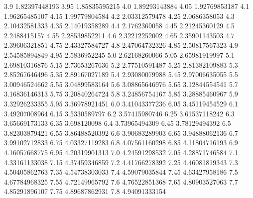             3.9    1.82397448193
           3.95    1.85835595215
            4.0    1.89293143884
           4.05    1.92769853187
            4.1    1.96265485107
           4.15    1.99779804584
            4.2    2.03312579478
           4.25     2.0686358053
            4.3    2.10432581333
           4.35    2.14019358289
            4.4     2.1762369058
           4.45    2.21245360129
            4.5     2.2488415157
           4.55    2.28539852211
            4.6    2.32212252002
           4.65    2.35901143503
            4.7    2.39606321851
           4.75    2.43327584727
            4.8    2.47064732326
           4.85    2.50817567323
            4.9    2.54585894849
           4.95     2.5836952245
            5.0    2.62168260066
           5.05    2.65981919997
            5.1    2.69810316876
           5.15    2.73653267636
            5.2    2.77510591487
           5.25    2.81382109883
            5.3    2.85267646496
           5.35    2.89167027189
            5.4    2.93080079988
           5.45    2.97006635055
            5.5    3.00946524662
           5.55    3.04899583164
            5.6    3.08865646976
           5.65    3.12844554541
            5.7    3.16836146313
           5.75    3.20840264724
            5.8    3.24856754167
           5.85    3.28885460967
            5.9    3.32926233355
           5.95    3.36978921451
            6.0    3.41043377236
           6.05    3.45119454529
            6.1    3.49207008964
           6.15     3.5330589797
            6.2    3.57415980746
           6.25    3.61537118242
            6.3    3.65669173133
           6.35      3.698120098
            6.4    3.73965494309
           6.45    3.78129494392
            6.5    3.82303879421
           6.55    3.86488520392
            6.6    3.90683289903
           6.65    3.94888062136
            6.7    3.99102712833
           6.75    4.03327119283
            6.8    4.07561160298
           6.85    4.11804716193
            6.9    4.16057668775
           6.95    4.20319901313
            7.0    4.24591298532
           7.05    4.28871746584
            7.1    4.33161133038
           7.15    4.37459346859
            7.2    4.41766278392
           7.25    4.46081819343
            7.3    4.50405862763
           7.35    4.54738303033
            7.4    4.59079035844
           7.45    4.63427958186
            7.5    4.67784968325
           7.55    4.72149965792
            7.6    4.76522851368
           7.65    4.80903527063
            7.7    4.85291896107
           7.75    4.89687862931
            7.8    4.94091333154
